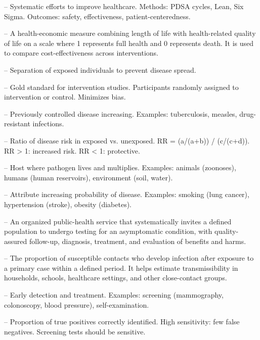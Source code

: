 -- Systematic efforts to improve healthcare. Methods: PDSA cycles, Lean, Six Sigma. Outcomes: safety, effectiveness, patient-centeredness.

-- A health-economic measure combining length of life with health-related quality of life on a scale where 1 represents full health and 0 represents death. It is used to compare cost-effectiveness across interventions.



-- Separation of exposed individuals to prevent disease spread.

-- Gold standard for intervention studies. Participants randomly assigned to intervention or control. Minimizes bias.

-- Previously controlled disease increasing. Examples: tuberculosis, measles, drug-resistant infections.

-- Ratio of disease risk in exposed vs. unexposed. RR = (a/(a+b)) / (c/(c+d)). RR > 1: increased risk. RR < 1: protective.



-- Host where pathogen lives and multiplies. Examples: animals (zoonoses), humans (human reservoirs), environment (soil, water).

-- Attribute increasing probability of disease. Examples: smoking (lung cancer), hypertension (stroke), obesity (diabetes).

-- An organized public-health service that systematically invites a defined population to undergo testing for an asymptomatic condition, with quality-assured follow-up, diagnosis, treatment, and evaluation of benefits and harms.

-- The proportion of susceptible contacts who develop infection after exposure to a primary case within a defined period. It helps estimate transmissibility in households, schools, healthcare settings, and other close-contact groups.

-- Early detection and treatment. Examples: screening (mammography, colonoscopy, blood pressure), self-examination.

-- Proportion of true positives correctly identified. High sensitivity: few false negatives. Screening tests should be sensitive.

